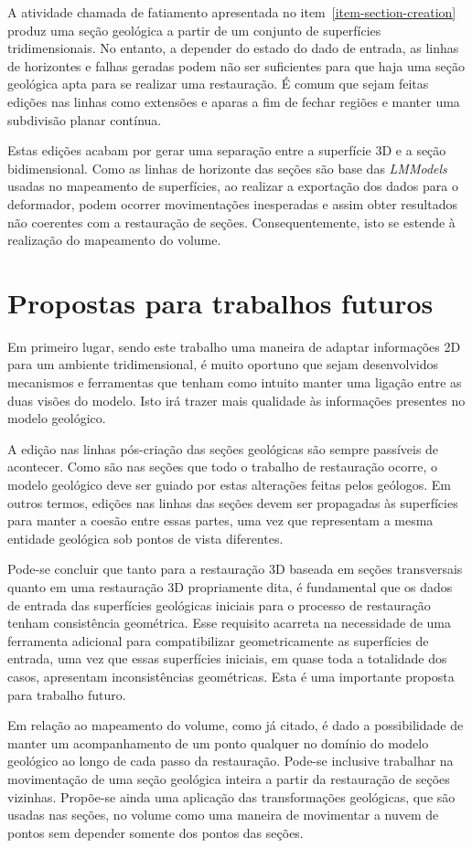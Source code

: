 A atividade chamada de fatiamento apresentada no item~\ref{item-section-creation} produz uma seção geológica a partir de um conjunto de superfícies tridimensionais. No entanto, a depender do estado do dado de entrada, as linhas de horizontes e falhas geradas podem não ser suficientes para que haja uma seção geológica apta para se realizar uma restauração. É comum que sejam feitas edições nas linhas como extensões e aparas a fim de fechar regiões e manter uma subdivisão planar contínua.

Estas edições acabam por gerar uma separação entre a superfície 3D e a seção bidimensional. Como as linhas de horizonte das seções são base das \emph{LMModels} usadas no mapeamento de superfícies, ao realizar a exportação dos dados para o deformador, podem ocorrer movimentações inesperadas e assim obter resultados não coerentes com a restauração de seções. Consequentemente, isto se estende à realização do mapeamento do volume.

\section{Propostas para trabalhos futuros}

Em primeiro lugar, sendo este trabalho uma maneira de adaptar informações 2D para um ambiente tridimensional, é muito oportuno que sejam desenvolvidos mecanismos e ferramentas que tenham como intuito manter uma ligação entre as duas visões do modelo. Isto irá trazer mais qualidade às informações presentes no modelo geológico.

A edição nas linhas pós-criação das seções geológicas são sempre passíveis de acontecer. Como são nas seções que todo o trabalho de restauração ocorre, o modelo geológico deve ser guiado por estas alterações feitas pelos geólogos. Em outros termos, edições nas linhas das seções devem ser propagadas às superfícies para manter a coesão entre essas partes, uma vez que representam a mesma entidade geológica sob pontos de vista diferentes.

Pode-se concluir que tanto para a restauração 3D baseada em seções transversais quanto em uma restauração 3D propriamente dita, é fundamental que os dados de entrada das superfícies geológicas iniciais para o processo de restauração tenham consistência geométrica. Esse requisito acarreta na necessidade de uma ferramenta adicional para compatibilizar geometricamente as superfícies de entrada, uma vez que essas superfícies iniciais, em quase toda a totalidade dos casos, apresentam inconsistências geométricas. Esta é uma importante proposta para trabalho futuro.

Em relação ao mapeamento do volume, como já citado, é dado a possibilidade de manter um acompanhamento de um ponto qualquer no domínio do modelo geológico ao longo de cada passo da restauração. Pode-se inclusive trabalhar na movimentação de uma seção geológica inteira a partir da restauração de seções vizinhas. Propõe-se ainda uma aplicação das transformações geológicas, que são usadas nas seções, no volume como uma maneira de movimentar a nuvem de pontos sem depender somente dos pontos das seções.
